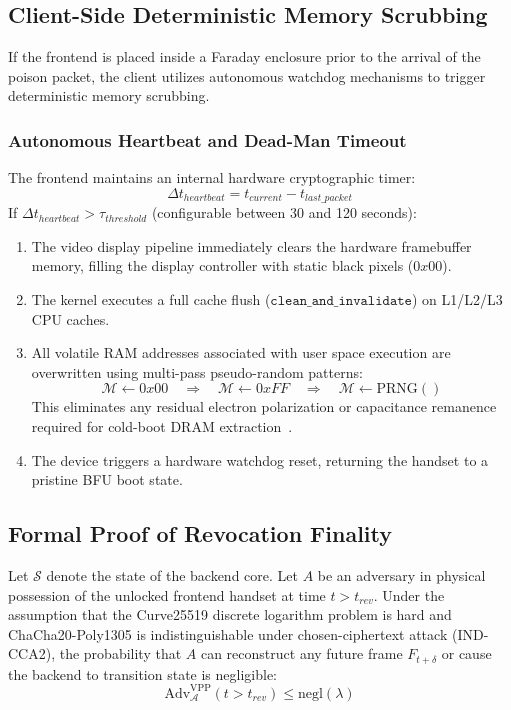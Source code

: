 \subsection{Client-Side Deterministic Memory Scrubbing}
If the frontend is placed inside a Faraday enclosure prior to the arrival of the poison packet, the client utilizes autonomous watchdog mechanisms to trigger deterministic memory scrubbing.

\subsubsection{Autonomous Heartbeat and Dead-Man Timeout}
The frontend maintains an internal hardware cryptographic timer:
\begin{equation}
    \Delta t_{heartbeat} = t_{current} - t_{last\_packet}
\end{equation}
If $\Delta t_{heartbeat} > \tau_{threshold}$ (configurable between 30 and 120 seconds):
\begin{enumerate}
    \item The video display pipeline immediately clears the hardware framebuffer memory, filling the display controller with static black pixels ($0x00$).
    \item The kernel executes a full cache flush ($\texttt{clean\_and\_invalidate}$) on L1/L2/L3 CPU caches.
    \item All volatile RAM addresses associated with user space execution are overwritten using multi-pass pseudo-random patterns:
    \begin{equation}
        \mathcal{M} \leftarrow 0x00 \quad \Longrightarrow \quad \mathcal{M} \leftarrow 0xFF \quad \Longrightarrow \quad \mathcal{M} \leftarrow \text{PRNG}()
    \end{equation}
    This eliminates any residual electron polarization or capacitance remanence required for cold-boot DRAM extraction~\cite{halderman2008coldboot}.
    \item The device triggers a hardware watchdog reset, returning the handset to a pristine BFU boot state.
\end{enumerate}

\subsection{Formal Proof of Revocation Finality}
\begin{theorem}
Let $\mathcal{S}$ denote the state of the backend core. Let $A$ be an adversary in physical possession of the unlocked frontend handset at time $t > t_{rev}$. Under the assumption that the Curve25519 discrete logarithm problem is hard and ChaCha20-Poly1305 is indistinguishable under chosen-ciphertext attack (IND-CCA2), the probability that $A$ can reconstruct any future frame $F_{t+\delta}$ or cause the backend to transition state is negligible:
\begin{equation}
    \mathrm{Adv}_{\mathcal{A}}^{\mathrm{VPP}}(t > t_{rev}) \le \mathrm{negl}(\lambda)
\end{equation}
\end{theorem}

